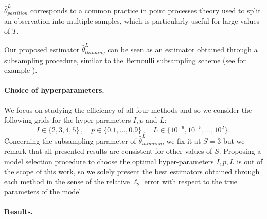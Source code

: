     $\hat \theta^L_{partition}$ corresponds to a common practice in point processes theory used to split an observation into multiple samples, which is particularly useful for large values of $T$.

    Our proposed estimator $\hat \theta^L_{thinning}$ can be seen as an estimator obtained through a subsampling procedure, similar to the Bernoulli subsampling scheme (see for example \textcite[Chapter 3.2]{Sarndal2003}). 
    
    \paragraph{Choice of hyperparameters.} We focus on studying the efficiency of all four methods and so we consider the following grids for the hyper-parameters $I, p$ and $L$:
    \[I\in\{2,3,4,5\}\,,\quad p\in\{0.1, \ldots, 0.9\}\,,\quad L\in\{10^{-6}, 10^{-5}, \ldots, 10^2\}\,.\]
    Concerning the subsampling parameter of $\hat \theta^L_{thinning}$, we fix it at $S=3$ but we remark that all presented results are consistent for other values of $S$.
    Proposing a model selection procedure to choose the optimal hyper-parameters $I, p, L$ is out of the scope of this work, 
    so we solely present the best estimators obtained through each method in the sense of the relative $\ell_2$ error with respect to the true parameters of the model.

    \paragraph{Results.} 
    

